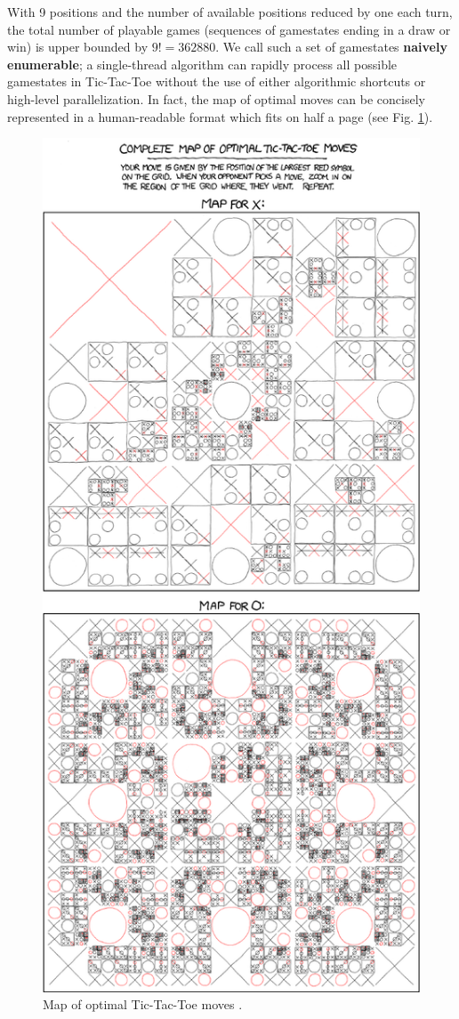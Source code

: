 \documentclass[english, 11pt]{article}
\begin{document}
With 9 positions and the number of available positions reduced by one each turn, the total number of playable games (sequences of gamestates ending in a draw or win) is upper bounded by $9!=362880$. We call such a set of gamestates \textbf{naively enumerable}; a single-thread algorithm can rapidly process all possible gamestates in Tic-Tac-Toe without the use of either algorithmic shortcuts or high-level parallelization. In fact, the map of optimal moves can be concisely represented in a human-readable format which fits on half a page (see Fig. \ref{fig:xkcd}).
\begin{figure}[!h]
	\centering
	\includegraphics[scale=.2]{./img/xkcd.png}
	\caption{Map of optimal Tic-Tac-Toe moves \cite{xkcd}.} \label{fig:xkcd}
\end{figure}
\end{document}
